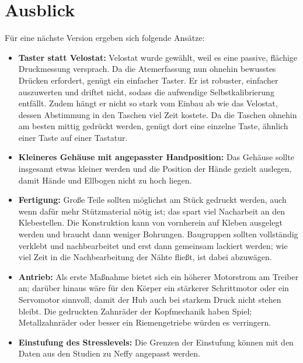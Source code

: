 \section{Ausblick}
\label{sec:ausblick}

Für eine nächste Version ergeben sich folgende Ansätze:

\begin{itemize}
  \item \textbf{Taster statt Velostat:} Velostat wurde gewählt, weil es eine passive, flächige
        Druckmessung versprach. Da die Atemerfassung nun ohnehin bewusstes Drücken erfordert,
        genügt ein einfacher Taster. Er ist robuster, einfacher auszuwerten und driftet nicht,
        sodass die aufwendige Selbstkalibrierung entfällt. Zudem hängt er nicht so stark vom
        Einbau ab wie das Velostat, dessen Abstimmung in den Taschen viel Zeit kostete. Da die
        Taschen ohnehin am besten mittig gedrückt werden, genügt dort eine einzelne Taste,
        ähnlich einer Taste auf einer Tastatur.
  \item \textbf{Kleineres Gehäuse mit angepasster Handposition:} Das Gehäuse sollte insgesamt
        etwas kleiner werden und die Position der Hände gezielt auslegen, damit Hände und
        Ellbogen nicht zu hoch liegen.
  \item \textbf{Fertigung:} Große Teile sollten möglichst am Stück gedruckt werden, auch wenn
        dafür mehr Stützmaterial nötig ist; das spart viel Nacharbeit an den Klebestellen. Die
        Konstruktion kann von vornherein auf Kleben ausgelegt werden und braucht dann weniger
        Bohrungen. Baugruppen sollten vollständig verklebt und nachbearbeitet und erst dann
        gemeinsam lackiert werden; wie viel Zeit in die Nachbearbeitung der Nähte fließt, ist
        dabei abzuwägen.
  \item \textbf{Antrieb:} Als erste Maßnahme bietet sich ein höherer Motorstrom am Treiber an;
        darüber hinaus wäre für den Körper ein stärkerer Schrittmotor oder ein Servomotor
        sinnvoll, damit der Hub auch bei starkem Druck nicht stehen bleibt. Die gedruckten
        Zahnräder der Kopfmechanik haben Spiel; Metallzahnräder oder besser ein Riemengetriebe
        würden es verringern.
  \item \textbf{Einstufung des Stresslevels:} Die Grenzen der Einstufung können mit den Daten aus den
        Studien zu Neffy angepasst werden.
\end{itemize}
